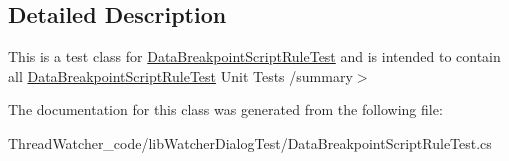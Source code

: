 \subsection{Detailed Description}
This is a test class for \hyperlink{classlib_watcher_dialog_test_1_1_data_breakpoint_script_rule_test}{Data\+Breakpoint\+Script\+Rule\+Test} and is intended to contain all \hyperlink{classlib_watcher_dialog_test_1_1_data_breakpoint_script_rule_test}{Data\+Breakpoint\+Script\+Rule\+Test} Unit Tests /summary$>$ 

The documentation for this class was generated from the following file\+:\begin{DoxyCompactItemize}
\item 
Thread\+Watcher\+\_\+code/lib\+Watcher\+Dialog\+Test/Data\+Breakpoint\+Script\+Rule\+Test.\+cs\end{DoxyCompactItemize}
